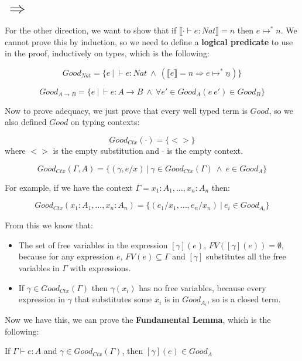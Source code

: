 \section{$\Rightarrow$}

For the other direction, we want to show that if $\llbracket \cdot \vdash e : Nat \rrbracket = n$ then $e \mapsto^* n$. We cannot prove this by induction, so we need to define a \textbf{logical predicate} to use in the proof, inductively on types, which is the following:

\[Good_{Nat} = \{e  \ | \ \vdash e : Nat \ \wedge \ (\llbracket e \rrbracket = n \Rightarrow e \mapsto^* \underline{n}) \} \]

\[Good_{A \to B} = \{ e \ | \  \vdash e : A \to B \ \wedge \ \forall e' \in Good_A (e \ e') \in Good_B \}\]

Now to prove adequacy, we just prove that every well typed term is $Good$, so we also defined  $Good$ on typing contexts:

\[Good_{Ctx} (\cdot) = \{ <>\} \]
where $<>$ is the empty substitution and $\cdot$ is the empty context.

\[Good_{Ctx}(\Gamma, A) = \{ (\gamma, e/x) \ | \ \gamma \in Good_{Ctx}(\Gamma) \ \wedge \ e \in Good_A\} \]

For example, if we have the context $\Gamma = x_1 : A_1, \dots , x_n : A_n$ then:

\[Good_{Ctx} (x_1 : A_1, \dots ,x_n : A_n) = \{(e_1 / x_1, \dots, e_n / x_n) \ | \ e_i \in Good_{A_i}\} \]

From this we know that:

\begin{itemize}
\item{The set of free variables in the expression $[\gamma](e)$, $FV([\gamma](e)) = \emptyset$, because for any expression $e$, $FV(e) \subseteq \Gamma$ and $[\gamma]$ substitutes all the free variables in $\Gamma$ with expressions.}
\item{If $\gamma \in Good_{Ctx}(\Gamma)$ then $\gamma(x_i)$ has no free variables, because every expression in $\gamma$ that substitutes some $x_i$ is in $Good_{A_i}$, so is a closed term.}
\end{itemize}


Now we have this, we can prove the \textbf{Fundamental Lemma}, which is the following:

\vspace{0.5cm}

\begin{lem}
If $\Gamma \vdash e:A$ and $\gamma \in Good_{Ctx}(\Gamma)$, then $[\gamma](e) \in Good_A$
\end{lem}

